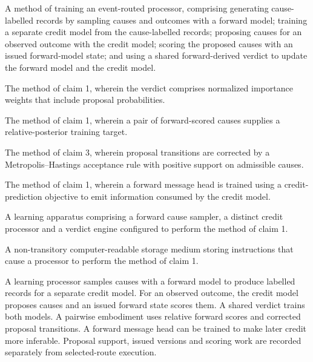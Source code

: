 \documentclass[pct]{sm-patent}
\begin{document}
\begin{patentclaims}

\item A method of training an event-routed processor, comprising generating cause-labelled records by sampling causes and outcomes with a forward model; training a separate credit model from the cause-labelled records; proposing causes for an observed outcome with the credit model; scoring the proposed causes with an issued forward-model state; and using a shared forward-derived verdict to update the forward model and the credit model.

\item The method of claim 1, wherein the verdict comprises normalized importance weights that include proposal probabilities.

\item The method of claim 1, wherein a pair of forward-scored causes supplies a relative-posterior training target.

\item The method of claim 3, wherein proposal transitions are corrected by a Metropolis--Hastings acceptance rule with positive support on admissible causes.

\item The method of claim 1, wherein a forward message head is trained using a credit-prediction objective to emit information consumed by the credit model.

\item A learning apparatus comprising a forward cause sampler, a distinct credit processor and a verdict engine configured to perform the method of claim 1.

\item A non-transitory computer-readable storage medium storing instructions that cause a processor to perform the method of claim 1.

\end{patentclaims}

\abstractstart

A learning processor samples causes with a forward model to produce labelled records for a separate credit model. For an observed outcome, the credit model proposes causes and an issued forward state scores them. A shared verdict trains both models. A pairwise embodiment uses relative forward scores and corrected proposal transitions. A forward message head can be trained to make later credit more inferable. Proposal support, issued versions and scoring work are recorded separately from selected-route execution.
\end{document}
